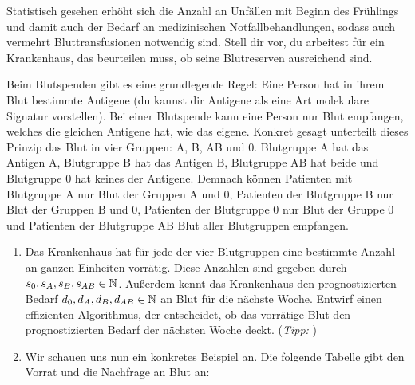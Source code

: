 \documentclass{uebung_cs}
\begin{document}
\newpage
\begin{exercise}[Blutspende][\athome\mittel]
    Statistisch gesehen erhöht sich die Anzahl an Unfällen mit Beginn des Frühlings und damit auch der Bedarf an medizinischen Notfallbehandlungen, sodass auch vermehrt Bluttransfusionen notwendig sind. Stell dir vor, du arbeitest für ein Krankenhaus, das beurteilen muss, ob seine Blutreserven ausreichend sind.

    Beim Blutspenden gibt es eine grundlegende Regel: Eine Person hat in ihrem Blut bestimmte Antigene (du kannst dir Antigene als eine Art molekulare Signatur vorstellen). Bei einer Blutspende kann eine Person nur Blut empfangen, welches die gleichen Antigene hat, wie das eigene. Konkret gesagt unterteilt dieses Prinzip das Blut in vier Gruppen: A, B, AB und 0. Blutgruppe A hat das Antigen A, Blutgruppe B hat das Antigen B, Blutgruppe AB hat beide und Blutgruppe 0 hat keines der Antigene. Demnach können Patienten mit Blutgruppe A nur Blut der Gruppen A und 0, Patienten der Blutgruppe B nur Blut der Gruppen B und 0, Patienten der Blutgruppe 0 nur Blut der Gruppe 0 und Patienten der Blutgruppe AB Blut aller Blutgruppen empfangen.
    \begin{enumerate}
    	\item Das Krankenhaus hat für jede der vier Blutgruppen eine bestimmte Anzahl an ganzen Einheiten vorrätig. Diese Anzahlen sind gegeben durch $s_0,s_A,s_B,s_{AB}\in\mathbb{N}$.
		Außerdem kennt das Krankenhaus den prognostizierten Bedarf $d_0, d_A,d_B,d_{AB}\in\mathbb{N}$ an Blut für die nächste Woche. Entwirf einen effizienten Algorithmus, der entscheidet, ob das vorrätige Blut den prognostizierten Bedarf der nächsten Woche deckt. (\emph{Tipp: })
    	\item
		Wir schauen uns nun ein konkretes Beispiel an.
		Die folgende Tabelle gibt den Vorrat und die Nachfrage an Blut an:
    	

\end{enumerate}
\end{exercise}
\end{document}
